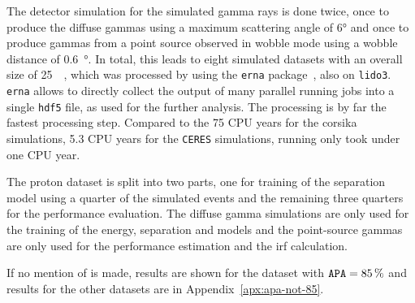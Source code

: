 The detector simulation for the simulated gamma rays is done twice,
once to produce the diffuse gammas using a maximum scattering angle of \ang{6}
and once to produce gammas from a point source observed in wobble mode using a wobble distance of \SI{0.6}{\degree}.
In total, this leads to eight simulated datasets with an overall size of \SI{25}{\tera\byte},
which was processed by \facttools{} using the \texttt{erna} package~\cite{erna},
also on \texttt{lido3}.
\texttt{erna} allows to directly collect the output of many parallel running \facttools{}
jobs into a single \texttt{hdf5} file, as used for the further analysis.
The \facttools{} processing is by far the fastest processing step.
Compared to the 75 CPU years for the \gls{corsika} simulations, \num{5.3} CPU years
for the \texttt{CERES} simulations, running \facttools{} only took under one CPU year.

The proton dataset is split into two parts,
one for training of the separation model using a quarter of the simulated events
and the remaining three quarters for the performance evaluation.
The diffuse gamma simulations are only used for the training of the energy, separation and
 models and the point-source gammas are only used for
the performance estimation and the \gls{irf} calculation.

If no mention of  is made, results are shown for the dataset with $\mathtt{APA}=\SI{85}{\percent}$ and results for the other datasets are
in Appendix~\ref{apx:apa-not-85}.

